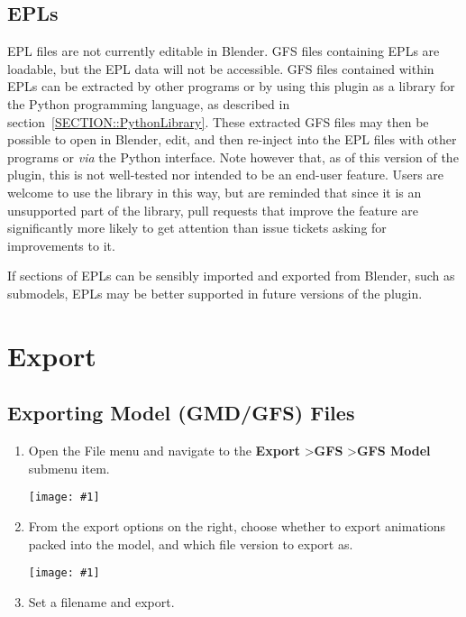 \documentclass{article}
\newenvironment{guide}[1]
{
	\begin{center}
		\begin{tcolorbox}[%
			colback=black!20, 
			boxrule=0pt, 
			title=Step-by-step: #1,
			enhanced,
			breakable,
			overlay unbroken={%
                \draw[line width=1pt, black, rounded corners]
        	    (frame.north west) rectangle (frame.south east);
			},
    		overlay first={%
        		 \draw[line width=1pt, black, rounded corners]
        	    (frame.south west) -- (frame.north west) -- (frame.north east) -- (frame.south east);
                \draw[line width=1pt, black]
                (frame.south west) -- (frame.south east);
            },
    		overlay middle={%
                \draw[line width=1pt, black]
        	    (frame.north west) rectangle (frame.south east);
        	},
    		overlay last={%
                \draw[line width=1pt, black, rounded corners]
        	    (frame.north west) -- (frame.south west) -- (frame.south east) -- (frame.north east);
                \draw[line width=1pt, black]
                (frame.north west) -- (frame.north east);
           	}
        ]{}
    	\begin{enumerate}
}
{
    		\end{enumerate}
    	\end{tcolorbox}
	\end{center}  	 
}
\newcommand{\guideimage}[1]
{
	\begin{center}
		\texttt{[image: \#1]}
	\end{center}
}
\begin{document}
\clearpage

\subsection{EPLs}
\label{SECTION::Edits::Epls}
EPL files are not currently editable in Blender. GFS files containing EPLs are loadable, but the EPL data will not be accessible. GFS files contained within EPLs can be extracted by other programs or by using this plugin as a library for the Python programming language, as described in section~\ref{SECTION::PythonLibrary}. These extracted GFS files may then be possible to open in Blender, edit, and then re-inject into the EPL files with other programs or \textit{via} the Python interface. Note however that, as of this version of the plugin, this is not well-tested nor intended to be an end-user feature. Users are welcome to use the library in this way, but are reminded that since it is an unsupported part of the library, pull requests that improve the feature are significantly more likely to get attention than issue tickets asking for improvements to it.

If sections of EPLs can be sensibly imported and exported from Blender, such as submodels, EPLs may be better supported in future versions of the plugin.

\clearpage

\section{Export}
\subsection{Exporting Model (GMD/GFS) Files}
\label{SECTION::EXPORT::ExportingModels}
\begin{guide}{Accessing the Model Export Menu}
\item Open the File menu and navigate to the \textbf{Export} \textgreater\space \textbf{GFS} \textgreater\space \textbf{GFS Model} submenu item.
\guideimage{images/export/export_gmd.png}
\item From the export options on the right, choose whether to export animations packed into the model, and which file version to export as.
\guideimage{images/export/export_gmd_properties.png}
\item Set a filename and export.
\end{guide}
\end{document}
